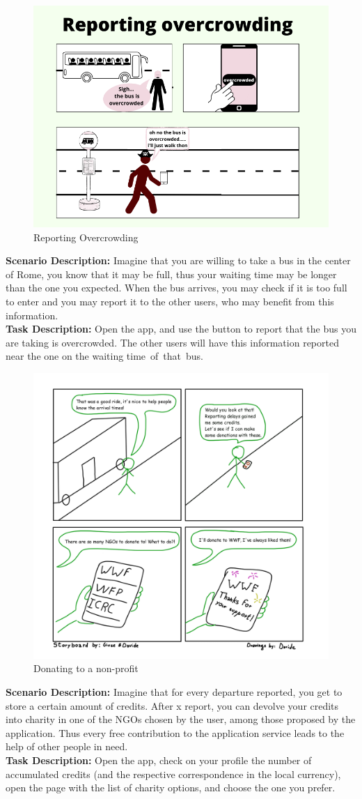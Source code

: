 \documentclass[a4paper, 11pt]{report}
\begin{document}
\begin{figure}[H]
	\centering	 
	\includegraphics[width=.5\textwidth]{img/storyboards/storyboard_overcrowding.png}
	\caption{Reporting Overcrowding }
	\label{fig:c}
\end{figure}
\textbf{Scenario Description:} Imagine that you are willing to take a bus in the center of Rome,
 you know that it may be full, thus your waiting time may be longer than the one you expected. When the bus arrives,
  you may check if it is too full to enter and you may report it to the other users, who may benefit from this information.\\
\textbf{Task Description:} Open the app, and use the button to report that the bus you are taking is overcrowded.
 The other users will have this information reported near the one on the waiting time of that bus.\\

\begin{figure}[H]
	\centering	
	\includegraphics [width=.5\textwidth]{img/storyboards/storyboard_donations.png}
	\caption{Donating to a non-profit}
	\label{fig:d}
\end{figure}
\textbf{Scenario Description:} Imagine that for every departure reported, you get to store a certain amount of credits.
 After x report, you can devolve your credits into charity in one of the NGOs chosen by the user, 
 among those proposed by the application. Thus every free contribution to the application service
  leads to the help of other people in need.\\
\textbf{Task Description:} Open the app, check on your profile the number of accumulated credits
 (and the respective correspondence in the local currency), open the page with the list of charity options,
  and choose the one you prefer.\\
\end{document}
